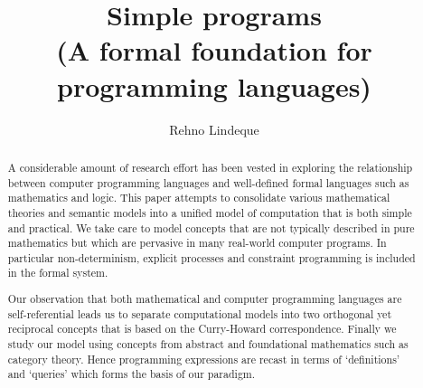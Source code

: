 \documentclass[11pt]{article}
\begin{document}
\title{Simple programs\\\small{(A formal foundation for programming languages)}}
\author{Rehno Lindeque}

\maketitle

\begin{abstract}
A considerable amount of research effort has been vested in exploring the relationship between computer programming languages and well-defined formal languages such as mathematics and logic.
This paper attempts to consolidate various mathematical theories and semantic models into a unified model of computation that is both simple and practical.
We take care to model concepts that are not typically described in pure mathematics but which are pervasive in many real-world computer programs.
In particular non-determinism, explicit processes and constraint programming is included in the formal system.


Our observation that both mathematical and computer programming languages are self-referential leads us to separate computational models into two orthogonal yet reciprocal concepts that is based on the Curry-Howard correspondence.
Finally we study our model using concepts from abstract and foundational mathematics such as category theory.
Hence programming expressions are recast in terms of `definitions' and `queries' which forms the basis of our paradigm.



\end{abstract}
\end{document}
